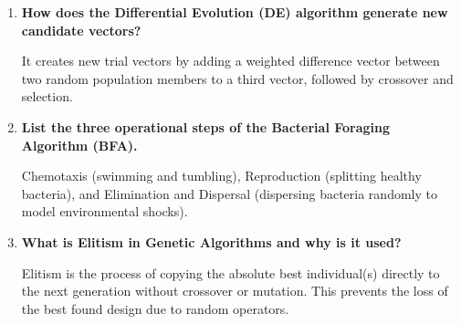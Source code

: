 \documentclass[12pt,a4paper]{article}
\newcommand{\Q}[1]{\textbf{#1}\par\noindent\ignorespaces}
\begin{document}
\begin{tcolorbox}[exambox, title={\textbf{Frequently Asked / Viva Questions}}]
\begin{enumerate}[topsep=0pt, label=\textbf{Q\arabic*.}, itemsep=5pt]
  \item \Q{How does the Differential Evolution (DE) algorithm generate new candidate vectors?}
    It creates new trial vectors by adding a weighted difference vector between two random population members to a third vector, followed by crossover and selection.
  \item \Q{List the three operational steps of the Bacterial Foraging Algorithm (BFA).}
    Chemotaxis (swimming and tumbling), Reproduction (splitting healthy bacteria), and Elimination and Dispersal (dispersing bacteria randomly to model environmental shocks).
  \item \Q{What is Elitism in Genetic Algorithms and why is it used?}
    Elitism is the process of copying the absolute best individual(s) directly to the next generation without crossover or mutation. This prevents the loss of the best found design due to random operators.
\end{enumerate}
\end{tcolorbox}
\end{document}
